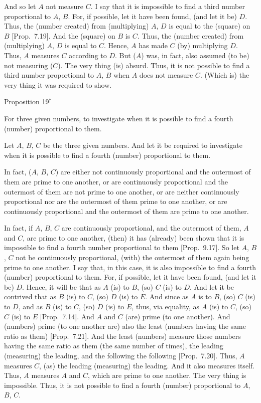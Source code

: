 And so let $A$ not measure $C$. I say that it is impossible to find a third
number proportional to $A$, $B$. For, if possible, let it have been found,
(and let it be) $D$. Thus, the (number created) from (multiplying) $A$, $D$
is equal to the (square) on $B$ [Prop.~7.19]. 
And the (square) on $B$ is $C$. Thus, the (number created) from (multiplying) $A$, $D$
is equal to $C$. Hence, $A$ has made $C$ (by) multiplying $D$. 
Thus, $A$ measures $C$ according to $D$. But ($A$) was, in fact, also assumed
(to be) not measuring ($C$). The very thing (is) absurd. Thus, it is not
possible to find a third number proportional to $A$, $B$ when $A$ does not
measure $C$. (Which is) the very thing it was required to show.


\begin{center}
{\large Proposition 19}$^\dag$
\end{center}

For three given numbers, to investigate when it is
possible to find a fourth (number) proportional to them.

\epsfysize=1.3in
\centerline{}

Let $A$, $B$, $C$ be the three given numbers. And let it be required to
investigate when it is possible to find a fourth (number) proportional to them.

In fact, ($A$, $B$, $C$) are either not continuously proportional and the outermost
of them are prime to one another, or are continuously proportional
and the outermost of them are not prime to one another, or are neither
continuously proportional nor are the outermost of them prime to one another, or are continuously proportional and the outermost of them are
prime to one another.

In fact, if $A$, $B$, $C$ are continuously proportional, and the outermost
of them, $A$ and $C$, are prime to one another, (then) it has (already) been shown that it is impossible to find a fourth number proportional to them
[Prop.~9.17]. So let $A$, $B$, $C$
not be continuously proportional, (with) the outermost of them again being
prime to one another. I say that, in this case, it is also impossible to find a fourth (number)
proportional to them. For, if possible, let it have been found,
(and let it be) $D$. Hence, it will be that as $A$ (is) to $B$, (so)
$C$ (is) to $D$. And let it be contrived that as $B$ (is) to $C$, (so) $D$ (is) to $E$. And since as $A$ is to $B$, (so) $C$ (is) to $D$, and as $B$ (is) to $C$, (so)
$D$ (is) to $E$, thus, via equality, as $A$ (is) to $C$, (so) $C$ (is) to $E$
[Prop.~7.14]. And $A$ and $C$ (are) prime (to one another). And (numbers) prime (to one another are) also the least (numbers
having the same ratio as them) [Prop.~7.21]. 
And the least (numbers) measure those numbers having the same ratio
as them (the same number of times), the leading (measuring) the leading,
and the following the following [Prop.~7.20]. 
Thus, $A$ measures $C$, (as) the leading (measuring) the leading.
And it also measures itself. Thus, $A$ measures $A$ and $C$, which are
prime to one another. The very thing is impossible. Thus, it is not possible to find a fourth (number) proportional to $A$, $B$, $C$.

